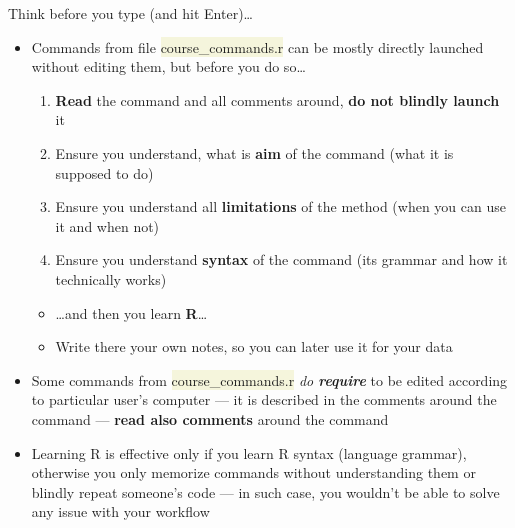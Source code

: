 \documentclass[compress, xelatex, 11pt, xcolor=svgnames, aspectratio=169,
	hyperref={
		bookmarks=true,
		unicode=true,
		colorlinks=true,
		pdftitle={Molecular data in R},
		plainpages=false,
		pdfauthor={Vojtech Zeisek},
		pdfsubject={Course about phylogeny and evolution in R},
		pdfcreator={XeLaTeX},
		pdfkeywords={R, evolution, phylogeny, molecular data},
		linkcolor=Crimson, %
		anchorcolor=Magenta, %
		citecolor=Magenta, %
		filecolor=Magenta, %
		menucolor=Magenta, %
		urlcolor=DodgerBlue, %
		},
	url={hyphens, lowtilde} %
	]{beamer}
\renewcommand{\texttt}[1]{\colorbox{Beige}{{\ttfamily #1}}}
\begin{document}
\begin{frame}{Think before you type (and hit Enter)\ldots}
	\begin{itemize}
		\item Commands from file \texttt{course\_commands.r} can be mostly directly launched without editing them, but before you do so\ldots
		\begin{enumerate}
			\item \textbf{Read} the command and all comments around, \textbf{do not blindly launch} it
			\item Ensure you understand, what is \textbf{aim} of the command (what it is supposed to do)
			\item Ensure you understand all \textbf{limitations} of the method (when you can use it and when not)
			\item Ensure you understand \textbf{syntax} of the command (its grammar and how it technically works)
		\end{enumerate}
		\begin{itemize}
			\item \ldots and then you \alert{learn} \textbf{R}\ldots
			\item Write there your own notes, so you can later use it for your data
		\end{itemize}
		\item Some \alert{commands} from \texttt{course\_commands.r} \alert{\textit{do \textbf{require}} to be edited} according to particular user's computer --- it is described in the comments around the command --- \textbf{read also comments} around the command
		\item Learning R is effective only if you learn R syntax (language grammar), otherwise you only memorize commands without understanding them or blindly repeat someone's code --- in such case, you wouldn't be able to solve any issue with your workflow
	\end{itemize}
\end{frame}
\end{document}

